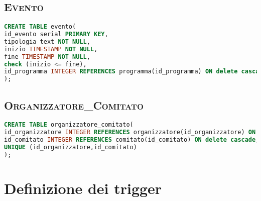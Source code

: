\subsection{\textsc{Evento}}
\begin{lstlisting}[language=SQL,style=mystyle, caption={Tabella: Evento}]
CREATE TABLE evento(
id_evento serial PRIMARY KEY,
tipologia text NOT NULL,
inizio TIMESTAMP NOT NULL,
fine TIMESTAMP NOT NULL,
check (inizio <= fine), 
id_programma INTEGER REFERENCES programma(id_programma) ON delete cascade NOT NULL
);
\end{lstlisting}
\subsection{\textsc{Organizzatore\_Comitato}}
\begin{lstlisting}[language=SQL,style=mystyle, caption={Tabella: Organizzatore\_Comitato}]
CREATE TABLE organizzatore_comitato(
id_organizzatore INTEGER REFERENCES organizzatore(id_organizzatore) ON delete cascade,
id_comitato INTEGER REFERENCES comitato(id_comitato) ON delete cascade,
UNIQUE (id_organizzatore,id_comitato) 
);
\end{lstlisting}
\section{Definizione dei trigger}
